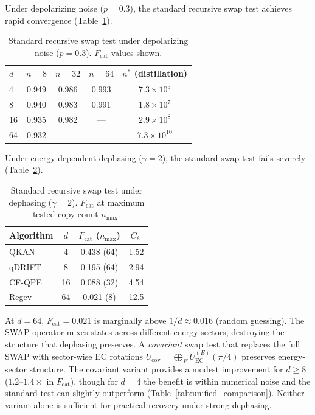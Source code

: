 \documentclass[a4paper,twocolumn]{quantumarticle}
\newenvironment{ruledtabular}{}{}%
\providecommand{\colrule}{\hline}
\begin{document}
Under depolarizing noise ($p = 0.3$), the standard recursive swap test achieves rapid convergence (Table~\ref{tab:standard_depol}).

\begin{table}[tb]
\caption{Standard recursive swap test under depolarizing noise ($p = 0.3$). $F_\mathrm{cat}$ values shown.}
\label{tab:standard_depol}
\centering\footnotesize
\setlength{\tabcolsep}{3pt}
\begin{ruledtabular}
\begin{tabular}{lcccc}
$d$ & $n = 8$ & $n = 32$ & $n = 64$ & $n^*$ (distillation) \\
\colrule
4 & 0.949 & 0.986 & 0.993 & $7.3 \times 10^5$ \\
8 & 0.940 & 0.983 & 0.991 & $1.8 \times 10^7$ \\
16 & 0.935 & 0.982 & --- & $2.9 \times 10^8$ \\
64 & 0.932 & --- & --- & $7.3 \times 10^{10}$ \\
\end{tabular}
\end{ruledtabular}
\end{table}

Under energy-dependent dephasing ($\gamma = 2$), the standard swap test fails severely (Table~\ref{tab:standard_deph}).

\begin{table}[tb]
\caption{Standard recursive swap test under dephasing ($\gamma = 2$). $F_\mathrm{cat}$ at maximum tested copy count $n_\mathrm{max}$.}
\label{tab:standard_deph}
\centering\footnotesize
\setlength{\tabcolsep}{3pt}
\begin{ruledtabular}
\begin{tabular}{lccc}
Algorithm & $d$ & $F_\mathrm{cat}$ ($n_\mathrm{max}$) & $C_{\ell_1}$ \\
\colrule
QKAN & 4 & 0.438 (64) & 1.52 \\
qDRIFT & 8 & 0.195 (64) & 2.94 \\
CF-QPE & 16 & 0.088 (32) & 4.54 \\
Regev & 64 & 0.021 (8) & 12.5 \\
\end{tabular}
\end{ruledtabular}
\end{table}

At $d = 64$, $F_\mathrm{cat} = 0.021$ is marginally above $1/d \approx 0.016$ (random guessing).
The SWAP operator mixes states across different energy sectors, destroying the structure that dephasing preserves.
A \emph{covariant} swap test that replaces the full SWAP with sector-wise EC rotations $U_\mathrm{cov} = \bigoplus_{E} U_\mathrm{EC}^{(E)}(\pi/4)$ preserves energy-sector structure.
The covariant variant provides a modest improvement for $d \geq 8$ ($1.2$--$1.4\times$ in $F_\mathrm{cat}$), though for $d = 4$ the benefit is within numerical noise and the standard test can slightly outperform (Table~\ref{tab:unified_comparison}).
Neither variant alone is sufficient for practical recovery under strong dephasing.
\end{document}
